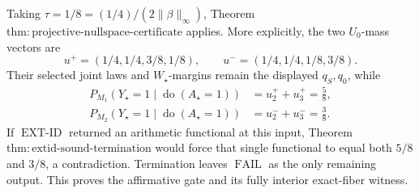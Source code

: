 Taking \(\tau=1/8=(1/4)/(2\lVert\beta\rVert_\infty)\), Theorem \(\mathrm{thm{:}projective\text{-}nullspace\text{-}certificate}\) applies.  More explicitly, the two \(U_0\)-mass vectors are
\[
 u^+=(1/4,1/4,3/8,1/8),
 \qquad u^-=(1/4,1/4,1/8,3/8).
\]
Their selected joint laws and \(W_\star\)-margins remain the displayed \(q_S,q_0\), while
\[
 \begin{aligned}
 P_{M_1}(Y_\star=1\mid\operatorname{do}(A_\star=1))
 &=u^+_2+u^+_3=\frac58,\\
 P_{M_2}(Y_\star=1\mid\operatorname{do}(A_\star=1))
 &=u^-_2+u^-_3=\frac38.
 \end{aligned}
\]
If \(\operatorname{EXT\text{-}ID}\) returned an arithmetic functional at this input, Theorem \(\mathrm{thm{:}extid\text{-}sound\text{-}termination}\) would force that single functional to equal both \(5/8\) and \(3/8\), a contradiction.  Termination leaves \(\operatorname{FAIL}\) as the only remaining output.  This proves the affirmative gate and its fully interior exact-fiber witness.